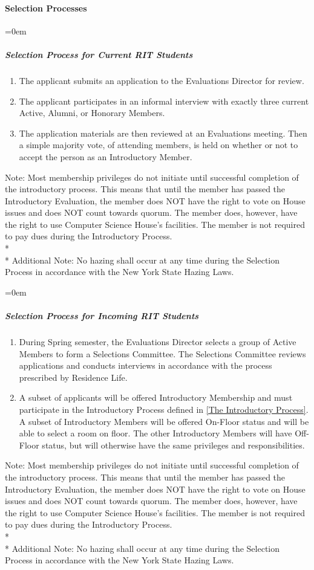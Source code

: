 \documentclass{article}
\newcommand{\asubsubsection}[1]{\paragraph{#1} \label{#1}}
\newcommand{\asubsubsubsection}[1]{\parindent=0em\subparagraph{#1} \label{#1}}
\begin{document}
\asubsubsection{Selection Processes}
\renewcommand{\theenumi}{\alph{enumi}} %

\asubsubsubsection{Selection Process for Current RIT Students}
\begin{enumerate}
	\item The applicant submits an application to the Evaluations Director for review.
	\item The applicant participates in an informal interview with exactly three current Active, Alumni, or Honorary Members.
	\item The application materials are then reviewed at an Evaluations meeting.
	Then a simple majority vote, of attending members, is held on whether or not to accept the person as an Introductory Member.
\end{enumerate}
Note: Most membership privileges do not initiate until successful completion of the introductory process.
This means that until the member has passed the Introductory Evaluation, the member does NOT have the right to vote on House issues and does NOT count towards quorum.
The member does, however, have the right to use Computer Science House's facilities.
The member is not required to pay dues during the Introductory Process.
\\* \\*
Additional Note: No hazing shall occur at any time during the Selection Process in accordance with the New York State Hazing Laws.

\asubsubsubsection{Selection Process for Incoming RIT Students}
\begin{enumerate}
	\item During Spring semester, the Evaluations Director selects a group of Active Members to form a Selections Committee.
		The Selections Committee reviews applications and conducts interviews in accordance with the process prescribed by Residence Life.
        \item A subset of applicants will be offered Introductory Membership and must participate in the Introductory Process defined in \ref{The Introductory Process}. 
            A subset of Introductory Members will be offered On-Floor status and will be able to select a room on floor. 
            The other Introductory Members will have Off-Floor status, but will otherwise have the same privileges and responsibilities.
\end{enumerate}
Note: Most membership privileges do not initiate until successful completion of the introductory process.
This means that until the member has passed the Introductory Evaluation, the member does NOT have the right to vote on House issues and does NOT count towards quorum.
The member does, however, have the right to use Computer Science House's facilities.
The member is not required to pay dues during the Introductory Process.
\\* \\*
Additional Note: No hazing shall occur at any time during the Selection Process in accordance with the New York State Hazing Laws.
\end{document}
